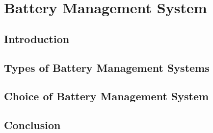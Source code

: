 \chapter{Battery Management System}
\section{Introduction}
\section{Types of Battery Management Systems}
\section{Choice of Battery Management System}
\section{Conclusion}
